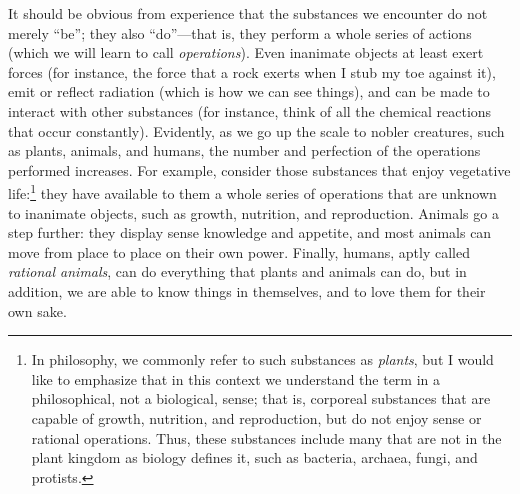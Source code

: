 \documentclass[
  12pt,
]{memoir}
\begin{document}
It should be obvious from experience that the substances we encounter do
not merely ``be''; they also ``do''---that is, they perform a whole
series of actions (which we will learn to call \emph{operations}). Even
inanimate objects at least exert forces (for instance, the force that a
rock exerts when I stub my toe against it), emit or reflect radiation
(which is how we can see things), and can be made to interact with other
substances (for instance, think of all the chemical reactions that occur
constantly). Evidently, as we go up the scale to nobler creatures, such
as plants, animals, and humans, the number and perfection of the
operations performed increases. For example, consider those substances
that enjoy vegetative life:\footnote{In philosophy, we commonly refer to
  such substances as \emph{plants}, but I would like to emphasize that
  in this context we understand the term in a philosophical, not a
  biological, sense; that is, corporeal substances that are capable of
  growth, nutrition, and reproduction, but do not enjoy sense or
  rational operations. Thus, these substances include many that are not
  in the plant kingdom as biology defines it, such as bacteria, archaea,
  fungi, and protists.} they have available to them a whole series of
operations that are unknown to inanimate objects, such as growth,
nutrition, and reproduction. Animals go a step further: they display
sense knowledge and appetite, and most animals can move from place to
place on their own power. Finally, humans, aptly called \emph{rational
animals}, can do everything that plants and animals can do, but in
addition, we are able to know things in themselves, and to love them for
their own sake.
\end{document}
